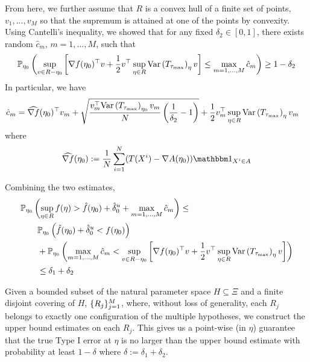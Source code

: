 \documentclass[10pt]{article}
\begin{document}
From here, we further assume that $R$ is a convex hull of a finite set of points,
$v_1,\ldots, v_M$ so that the supremum is attained at one of the points by convexity.
Using Cantelli's inequality,
we showed that for any fixed $\delta_2 \in [0,1]$,
there exists random $\hat{c}_m$, $m=1,\ldots, M$,
such that 
\begin{align*}
    \PPP_{\eta_0}\paren{%
        \sup\limits_{v\in R-\eta_0}
        \bracket{%
            \nabla f(\eta_0)^\top v
            +
            \frac{1}{2}
            v^\top 
            \sup\limits_{\eta \in R} \var{T_{\tau_{\max}}}_{\eta}
            v
        }
        \leq 
        \max\limits_{m=1,\ldots, M} \hat{c}_m
    }
    \geq
    1-\delta_2
\end{align*}
In particular, we have
\begin{align*}
    \hat{c}_m
    &=
    \widehat{\nabla f}(\eta_0)^\top v_m
    +
    \sqrt{%
        \frac{v_m^\top \var{T_{\tau_{\max}}}_{\eta_0} v_m}{N}
        \paren{\frac{1}{\delta_2}-1}
    }
    +
    \frac{1}{2}
    v_m^\top 
    \sup\limits_{\eta \in R} \var{T_{\tau_{\max}}}_{\eta}
    v_m
\end{align*}
where 
\begin{align*}
    \widehat{\nabla f}(\eta_0) 
    :=
    \frac{1}{N} \sum\limits_{i=1}^N
    (T(X^i) - \nabla A(\eta_0)) \indic{X^i \in A}
\end{align*}

Combining the two estimates,
\begin{align*}
    &\PPP_{\eta_0}\paren{%
        \sup\limits_{\eta \in R} f(\eta)
        >
        \hat{f}(\eta_0) + \hat{\delta}_0^u
        +
        \max\limits_{m=1,\ldots, M} \hat{c}_m
    }
    \leq
    \\&\qquad 
    \PPP_{\eta_0}\paren{%
        \hat{f}(\eta_0) + \hat{\delta}_0^u
        <
        f(\eta_0)
    }
    \\&\qquad +
    \PPP_{\eta_0}\paren{%
        \max\limits_{m=1,\ldots, M} \hat{c}_m
        <
        \sup\limits_{v\in R-\eta_0}
        \bracket{%
            \nabla f(\eta_0)^\top v
            +
            \frac{1}{2}
            v^\top 
            \sup\limits_{\eta \in R} \var{T_{\tau_{\max}}}_{\eta}
            v
        }
    }
    \\&\qquad \leq
    \delta_1 + \delta_2
\end{align*}

Given a bounded subset of the natural parameter space $H \subseteq \Xi$
and a finite disjoint covering of $H$, $\{R_j\}_{j=1}^M$,
where, without loss of generality, each $R_j$ belongs to
exactly one configuration of the multiple hypotheses,
we construct the upper bound estimates on each $R_j$.
This gives us a point-wise (in $\eta$) guarantee
that the true Type I error at $\eta$ is no larger than the upper bound estimate
with probability at least $ 1-\delta$
where $\delta := \delta_1 + \delta_2$.
\end{document}

